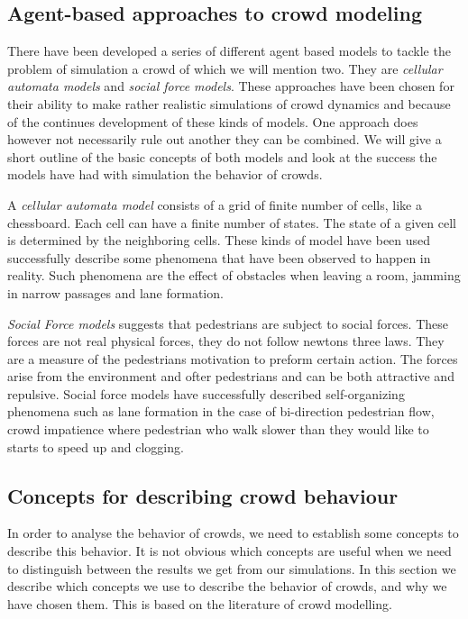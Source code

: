 \subsection{Agent-based approaches to crowd modeling}\label{subsec:ABapproach}
There have been developed a series of different agent based models to tackle the 
problem of simulation a crowd of which we will mention two. They are 
\emph{cellular automata models} and \emph{social force models}. These approaches 
have been chosen for their ability to make rather realistic simulations of 
crowd dynamics and because of the continues development of these kinds of models.
One approach does however not necessarily rule out another they can be combined. 
We will give a short outline of the basic concepts of both models and look at the 
success the models have had with simulation the behavior of crowds. 

A \emph{cellular automata model} consists of a grid of finite number of cells, like a chessboard. 
Each cell can have a finite number of states. The state of a given cell is determined by the 
neighboring cells. These kinds of model have been used successfully describe some phenomena 
that have been observed to happen in reality. Such phenomena are the effect of obstacles when 
leaving a room, jamming in narrow passages and lane formation. 

\emph{Social Force models} suggests that pedestrians are subject to social forces. These 
forces are not real physical forces, they do not follow newtons three laws. They are a 
measure of the pedestrians motivation to preform certain action. The forces arise from 
the environment and ofter pedestrians and can be both attractive and repulsive. 
Social force models have successfully described self-organizing phenomena such 
as lane formation in the case of bi-direction pedestrian flow, crowd impatience 
where pedestrian who walk slower than they would like to starts to speed up and clogging. 


\subsection{Concepts for describing crowd behaviour}\label{concepts}
In order to analyse the behavior of crowds, we need to establish some 
concepts to describe this behavior. It is not obvious which concepts  are 
useful when we need to distinguish between the results we get from our 
simulations. In this section we describe which concepts we use to describe the 
behavior of crowds, and why we have chosen them. This is based on the 
literature of crowd modelling.

